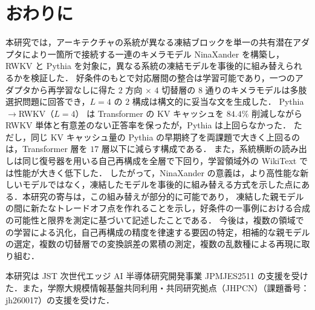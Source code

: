 \documentclass[techrep,noauthor]{ipsj}
\newcommand{\kw}[1]{#1}
\newcommand{\PtoR}{Pythia$\to$\allowbreak RWKV}
\newcommand{\PtoRL}[1]{\PtoR{}（$L{=}#1$）}
\begin{document}
\section{おわりに}\label{sec:conclusion}
本研究では，アーキテクチャの系統が異なる凍結ブロックを単一の共有潜在アダプタにより一箇所で接続する一連のキメラモデル
\kw{NinaXander} を構築し，RWKV と Pythia を対象に，異なる系統の凍結モデルを事後的に組み替えられるかを検証した．
好条件のもとで対応層間の整合は学習可能であり，一つのアダプタから再学習なしに得た $2$ 方向 $\times$ $4$ 切替層の $8$ 通りのキメラモデルは多肢選択問題に回答でき，$L{=}4$ の $2$ 構成は構文的に妥当な文を生成した．
\PtoRL{4} は Transformer の KV キャッシュを $84.4\%$ 削減しながら RWKV 単体と有意差のない正答率を保ったが，Pythia は上回らなかった．
ただし，同じ KV キャッシュ量の Pythia の早期終了を両課題で大きく上回るのは，Transformer 層を $17$ 層以下に減らす構成である．
また，系統横断の読み出しは同じ復号器を用いる自己再構成を全層で下回り，学習領域外の WikiText では性能が大きく低下した．
したがって，NinaXander の意義は，より高性能な新しいモデルではなく，凍結したモデルを事後的に組み替える方式を示した点にある．本研究の寄与は，この組み替えが部分的に可能であり，
凍結した親モデルの間に新たなトレードオフ点を作れることを示し，好条件の一事例における合成の可能性と限界を測定に基づいて記述したことである．
今後は，複数の領域での学習による汎化，自己再構成の精度を律速する要因の特定，相補的な親モデルの選定，複数の切替層での変換誤差の累積の測定，複数の乱数種による再現に取り組む．

\begin{acknowledgment}
本研究は JST 次世代エッジ AI 半導体研究開発事業 JPMJES2511 の支援を受けた．また，学際大規模情報基盤共同利用・共同研究拠点（JHPCN）（課題番号：jh260017）の支援を受けた．
\end{acknowledgment}




\appendix
\end{document}
